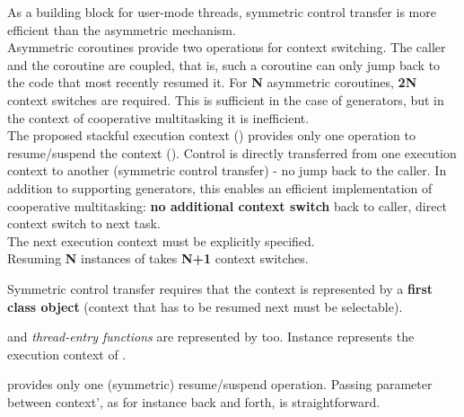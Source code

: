 As a building block for user-mode threads, symmetric control transfer is more
efficient than the asymmetric mechanism.\\
\newline
Asymmetric coroutines provide two operations for context switching. The caller
and the coroutine are coupled, that is, such a coroutine can only jump back to
the code that most recently resumed it.
For {\bfseries N} asymmetric coroutines, {\bfseries 2N} context switches are
required. This is sufficient in the case of generators, but in the context of
cooperative multitasking it is inefficient.\\
\newline
The proposed stackful execution context (\ectx) provides only one operation to
resume/suspend the context (\ectxop). Control is directly transferred from one
execution context to another (symmetric control transfer) - no jump back to
the caller. In addition to supporting generators, this enables an efficient
implementation of cooperative multitasking: {\bfseries no additional context
switch} back to caller, direct context switch to next task.\\
The next execution context must be explicitly specified.\\
\newline
{}
Resuming {\bfseries N} instances of \ectx takes {\bfseries N+1} context
switches.

Symmetric control transfer requires that the context is represented by a
{\bfseries first class object} (context that has to be resumed next must be
selectable).

\main and \emph{thread-entry functions} are represented by \ectx too.
Instance  represents the execution context of \main.


 provides only one (symmetric) resume/suspend operation.
Passing parameter between context', as for instance back and forth, is
straightforward.


